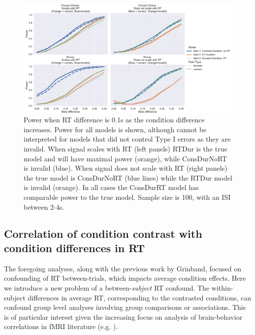 \documentclass[titlepage,12pt] {article}
\begin{document}
\begin{figure}[h!]
  \centering
   \includegraphics[width=5in]{Figures/power_24_rtdiff_1.pdf}
   \caption{Power when RT difference is 0.1s as the condition difference increases. Power for all models is shown, although cannot be interpreted for models that did not control Type I errors as they are invalid.  When signal scales with RT (left panels) RTDur is the true model and will have maximal power (orange), while ConsDurNoRT is invalid (blue). When signal does not scale with RT (right panels) the true model is ConsDurNoRT (blue lines) while the RTDur model is invalid (orange). In all cases the ConsDurRT model has comparable power to the true model.  Sample size is 100, with an ISI between 2-4s. }
  \label{fig:power_rtdiff}
\end{figure}


\subsection*{Correlation of condition contrast with condition differences in RT}

The foregoing analyses, along with the previous work by Grinband, focused on confounding of RT between-trials, which impacts average condition effects.  Here we introduce a new problem of a between-\emph{subject} RT confound.  The within-subject differences in average RT, corresponding to the contrasted conditions,  can confound group level analyses involving group comparisons or associations.  This is of particular interest given the increasing focus on analysis of brain-behavior correlations in fMRI literature (e.g. \citet{duboisBuildingScienceIndividual2016}).
\end{document}
